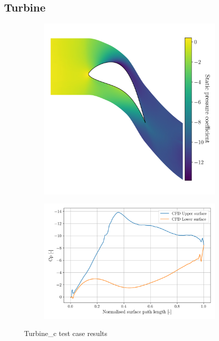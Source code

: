 \documentclass{article}
\begin{document}
\subsection{Turbine}

\begin{figure}[H]
    \centering
    \begin{subfigure}{0.44\textwidth}
        \centering
        \includegraphics[width=0.99\textwidth]{figures/turbine_c_cp.png}
        \caption{}
        \label{fig:turbine_c_cp}
    \end{subfigure}
    \begin{subfigure}{0.55\textwidth}
        \centering
        \includegraphics[width=0.99\textwidth]{figures/turbine_c_surface_cp_0.0.png}
        \caption{}
        \label{fig:turbine_c_surface_cp}
    \end{subfigure}
    \caption{Turbine\_c test case results}
\end{figure}
\end{document}
